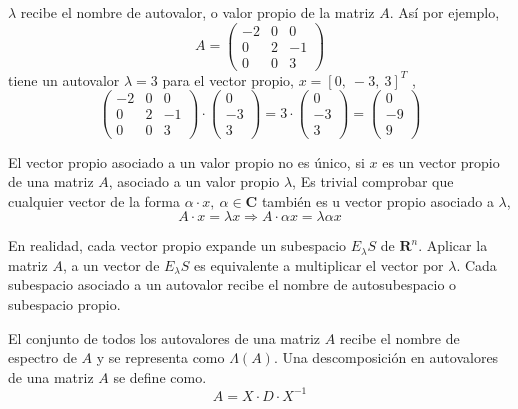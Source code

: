 $\lambda$ recibe el nombre de autovalor, o valor propio de la matriz $A$. Así por ejemplo,
\begin{equation*}
A= \begin{pmatrix}
-2& 0& 0\\
0& 2 & -1\\
0& 0& 3
\end{pmatrix}
\end{equation*}
tiene un autovalor $\lambda=3$ para el vector propio, $x=[0,\  -3,\  3]^T$ , 
\begin{equation*}
\begin{pmatrix}
-2& 0& 0\\
0& 2 & -1\\
0& 0& 3
\end{pmatrix}\cdot \begin{pmatrix}
0\\
-3\\
3
\end{pmatrix}=3\cdot \begin{pmatrix}
0\\
-3\\
3
\end{pmatrix}=\begin{pmatrix}
0\\
-9\\
9
\end{pmatrix}
\end{equation*}

El vector propio asociado a un valor propio no es único, si $x$ es un vector propio de una matriz $A$, asociado a un valor propio $\lambda$, Es trivial comprobar que cualquier vector de la forma $\alpha\cdot x, \ \alpha \in \mathbf{C}$ también es u vector propio asociado a $\lambda$,
\begin{equation}
A\cdot x= \lambda x \Rightarrow A \cdot \alpha x = \lambda  \alpha x
\end{equation}

En realidad, cada vector propio expande un subespacio $E_{\lambda}S$ de $\mathbf{R}^n$. Aplicar la matriz $A$, a un vector de $E_{\lambda}S$ es equivalente a multiplicar el vector por $\lambda$. Cada subespacio asociado a un autovalor recibe el nombre de autosubespacio o subespacio propio. 

El conjunto de todos los autovalores de una matriz $A$ recibe el nombre de espectro de $A$ y se representa como $\Lambda(A)$.
Una descomposición en autovalores de una matriz $A$ se define como.
\begin{equation*}
A=X\cdot D \cdot X^{-1}
\end{equation*}

